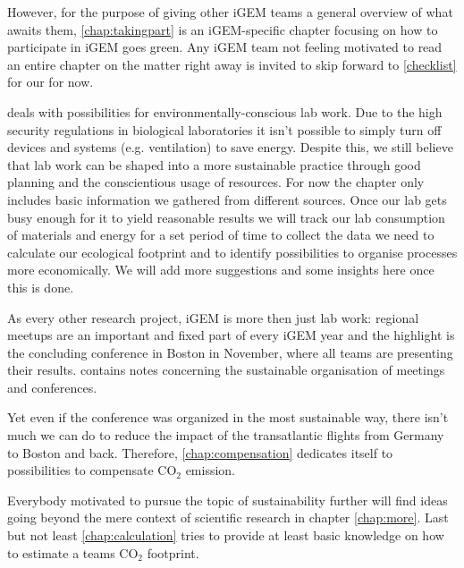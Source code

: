 However, for the purpose of giving other iGEM teams a general overview of what awaits them, \cref{chap:takingpart} is an iGEM-specific chapter focusing on how to participate in iGEM goes green. Any iGEM team not feeling motivated to read an entire chapter on the matter right away is invited to skip forward to \cref{checklist} for our  for now.

 deals with possibilities for environmentally-conscious lab work. Due to the high security regulations in biological laboratories it isn’t possible to simply turn off devices and systems (e.g. ventilation) to save energy. Despite this, we still believe that lab work can be shaped into a more sustainable practice through good planning and the conscientious usage of resources. For now the chapter only includes basic information we gathered from different sources. Once our lab gets busy enough for it to yield reasonable results we will track our lab consumption of materials and energy for a set period of time to collect the data we need to calculate our ecological footprint and to identify possibilities to organise processes more economically. We will add more suggestions and some insights here once this is done.

As every other research project, iGEM is more then just lab work: regional meetups are an important and fixed part of every iGEM year and the highlight is the concluding conference in Boston in November, where all teams are presenting their results.  contains notes concerning the sustainable organisation of meetings and conferences. 

Yet even if the conference was organized in the most sustainable way, there isn't much we can do to reduce the impact of the transatlantic flights from Germany to Boston and back. Therefore, \cref{chap:compensation} dedicates itself to possibilities to compensate CO$_2$ emission.

Everybody motivated to pursue the topic of sustainability further will find ideas going beyond the mere context of scientific research in chapter \cref{chap:more}. Last but not least \cref{chap:calculation} tries to provide at least basic knowledge on how to estimate a teams CO$_2$ footprint.
